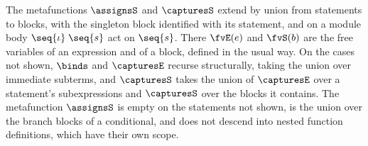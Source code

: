 The metafunctions $\assignsS$ and $\capturesS$ extend by union from statements to blocks, with the singleton
block identified with its statement, and on a module body $\seq{\iota}\;\seq{s}$ act on $\seq{s}$.
There $\fvE(e)$ and $\fvS(b)$ are the free variables of an expression and of a block, defined in the
usual way. On the cases not shown, $\binds$ and $\capturesE$ recurse structurally, taking the union over
immediate subterms, and $\capturesS$ takes the union of $\capturesE$ over a statement's subexpressions and
$\capturesS$ over the blocks it contains. The metafunction $\assignsS$ is empty on the statements not shown, is the union over the branch blocks of
a conditional, and does not descend into nested function definitions, which have their own scope.


